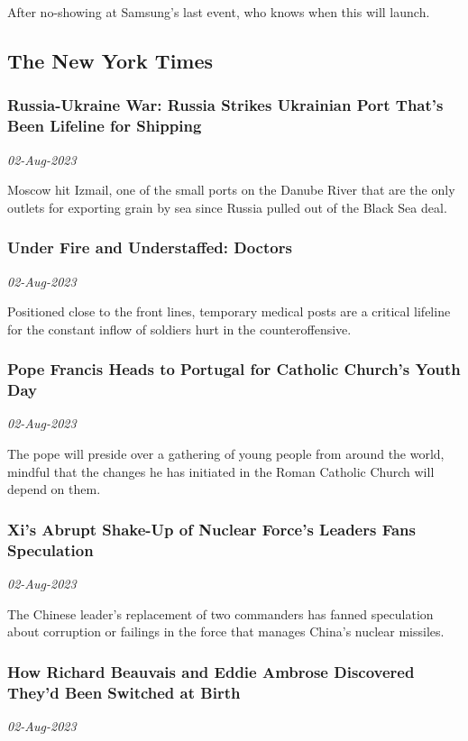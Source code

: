 After no-showing at Samsung's last event, who knows when this will launch.
\subsection{The New York Times \href{https://www.nytimes.com/international/}{}}
\subsubsection{Russia-Ukraine War: Russia Strikes Ukrainian Port That’s Been Lifeline for Shipping \href{https://www.nytimes.com/live/2023/08/02/world/russia-ukraine-news}{}}
\textit{02-Aug-2023}

Moscow hit Izmail, one of the small ports on the Danube River that are the only outlets for exporting grain by sea since Russia pulled out of the Black Sea deal.
\subsubsection{Under Fire and Understaffed: Doctors \href{https://www.nytimes.com/2023/08/02/world/europe/ukraine-war-casualties-wounded.html}{}}
\textit{02-Aug-2023}

Positioned close to the front lines, temporary medical posts are a critical lifeline for the constant inflow of soldiers hurt in the counteroffensive.
\subsubsection{Pope Francis Heads to Portugal for Catholic Church’s Youth Day \href{https://www.nytimes.com/2023/08/02/world/europe/pope-francis-portugal-youth-day.html}{}}
\textit{02-Aug-2023}

The pope will preside over a gathering of young people from around the world, mindful that the changes he has initiated in the Roman Catholic Church will depend on them.
\subsubsection{Xi’s Abrupt Shake-Up of Nuclear Force’s Leaders Fans Speculation \href{https://www.nytimes.com/2023/08/02/world/asia/china-nuclear-shakeup.html}{}}
\textit{02-Aug-2023}

The Chinese leader’s replacement of two commanders has fanned speculation about corruption or failings in the force that manages China’s nuclear missiles.
\subsubsection{How Richard Beauvais and Eddie Ambrose Discovered They’d Been Switched at Birth \href{https://www.nytimes.com/2023/08/02/world/canada/canada-men-switched-at-birth.html}{}}
\textit{02-Aug-2023}

